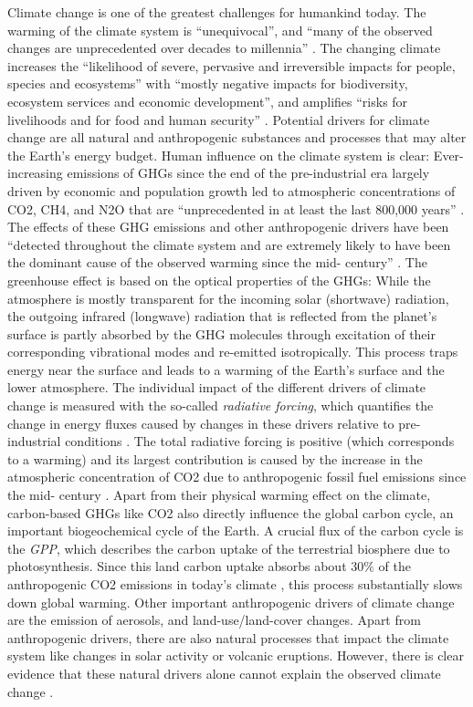 Climate change is one of the greatest challenges for humankind today. The
warming of the climate system is \enquote{unequivocal}, and \enquote{many of
  the observed changes are unprecedented over decades to millennia}
\autocite{IPCC2014}. The changing climate increases the \enquote{likelihood of
  severe, pervasive and irreversible impacts for people, species and
  ecosystems} with \enquote{mostly negative impacts for biodiversity, ecosystem
services and economic development}, and amplifies \enquote{risks for
livelihoods and for food and human security} \autocite{IPCC2014}. Potential
drivers for climate change are all natural and anthropogenic substances and
processes that may alter the Earth's energy budget. Human influence on the
climate system is clear: Ever-increasing emissions of \acp{GHG} since the end
of the pre-industrial era largely driven by economic and population growth
led to atmospheric concentrations of \ac{CO2}, \ac{CH4}, and \ac{N2O} that
are \enquote{unprecedented in at least the last 800,000 years}
\autocite{IPCC2014}. The effects of these \ac{GHG} emissions and other
anthropogenic drivers have been \enquote{detected throughout the climate
system and are extremely likely to have been the dominant cause of the
observed warming since the mid- century} \autocite{IPCC2014}. The
greenhouse effect is based on the optical properties of the \acp{GHG}: While
the atmosphere is mostly transparent for the incoming solar (shortwave)
radiation, the outgoing infrared (longwave) radiation that is reflected from
the planet's surface is partly absorbed by the \ac{GHG} molecules through
excitation of their corresponding vibrational modes and re-emitted
isotropically. This process traps energy near the surface and leads to a
warming of the Earth's surface and the lower atmosphere. The individual
impact of the different drivers of climate change is measured with the
so-called \emph{radiative forcing}, which quantifies the change in energy
fluxes caused by changes in these drivers relative to pre-industrial
conditions \autocite{IPCC2013}. The total radiative forcing is positive
(which corresponds to a warming) and its largest contribution is caused by
the increase in the atmospheric concentration of \ac{CO2} due to
anthropogenic fossil fuel emissions since the mid- century
\autocite{IPCC2014}. Apart from their physical warming effect on the climate,
carbon-based \acp{GHG} like \ac{CO2} also directly influence the global
carbon cycle, an important biogeochemical cycle of the Earth. A crucial flux
of the carbon cycle is the \emph{\ac{GPP}}, which describes the carbon uptake
of the terrestrial biosphere due to photosynthesis. Since this land carbon
uptake absorbs about $30 \unit{\%}$ of the anthropogenic \ac{CO2} emissions
in today's climate \autocite{Friedlingstein2020}, this process substantially
slows down global warming. Other important anthropogenic drivers of climate
change are the emission of aerosols, and land-use/land-cover changes. Apart
from anthropogenic drivers, there are also natural processes that impact the
climate system like changes in solar activity or volcanic eruptions. However,
there is clear evidence that these natural drivers alone cannot explain the
observed climate change \autocite{Haustein2017}.

